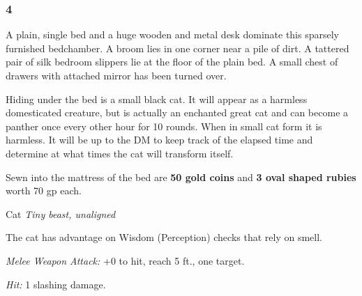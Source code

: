 \documentclass[palace_of_the_silver_princess]{subfiles}
\begin{document}
\subsubsection{4}
\begin{quotebox}
    A plain, single bed and a huge wooden and metal desk dominate this
    sparsely furnished bedchamber. A broom lies in one corner near a
    pile of dirt.  A tattered pair of silk bedroom slippers lie at the
    floor of the plain bed. A small chest of drawers with attached
    mirror has been turned over.
\end{quotebox}

Hiding under the bed is a small black cat. It will appear as a harmless
domesticated creature, but is actually an enchanted great cat and can
become a panther once every other hour for 10 rounds. When in small cat
form it is harmless. It will be up to the DM to keep track of the
elapsed time and determine at what times the cat will transform itself.

Sewn into the mattress of the bed are \textbf{50 gold coins} and
\textbf{3 oval shaped rubies} worth 70 gp each.

\begin{monsterbox}{Cat}
	\textit{Tiny beast, unaligned}\\
	\hline
	\basics[
		armorclass = {12},
		hitpoints = {2 (1d4)},
		speed = {40~ft., climb 40~ft.}]
	\hline
	\stats[
		STR = \stat{3},
		DEX = \stat{15},
		CON = \stat{10},
		INT = \stat{3},
		WIS = \stat{12},
		CHA = \stat{7}]
	\hline
	\details[
        skills = {Perception +3, Stealth +4},
		senses = {passive Perception 13},
		languages = {---},
		challenge = {0 (10 XP)}]
	\hline
	\begin{monsteraction}
        The cat has advantage on Wisdom (Perception) checks that rely on
        smell.
	\end{monsteraction}
    \begin{monsteraction}[Claws]
		\textit{Melee Weapon Attack:} +0 to hit, reach 5 ft., one
        target.

        \textit{Hit:} 1 slashing damage.
	\end{monsteraction}
\end{monsterbox}
\end{document}

